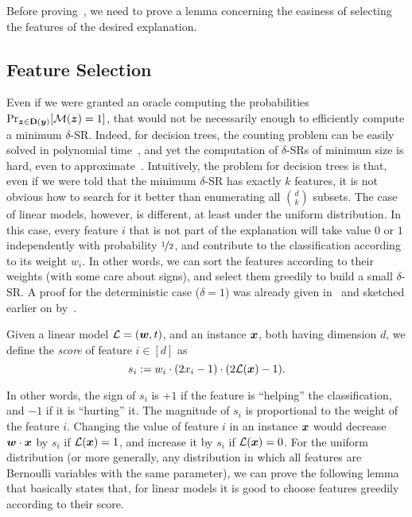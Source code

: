 Before proving~, we need to prove a lemma concerning the easiness of selecting the features of the desired explanation.

\subsection{Feature Selection}\label{subsec:feature_selection}

Even if we were granted an oracle computing the probabilities
\(
    \Pr_{{\bm{z}}  \in \mathbf{D}({\bm{y}})}[\mathcal{M}({\bm{z}}) = 1]
\), that would not be necessarily enough to efficiently compute a minimum $\delta$-SR. Indeed, for decision trees, the counting problem can be easily solved in polynomial time~\cite{NEURIPS2020_b1adda14}, and yet the computation of $\delta$-SRs of minimum size is hard, even to approximate~\cite{NEURIPS2022_b8963f6a, Kozachinskiy_2023}.
Intuitively, the problem for decision trees is that, even if we were told that the minimum $\delta$-SR has exactly $k$ features, it is not obvious how to search for it better than enumerating all $\binom{d}{k}$ subsets. The case of linear models, however, is different, at least under the uniform distribution. In this case, every feature $i$ that is not part of the explanation will take value $0$ or $1$ independently with probability $\nicefrac{1}{2}$, and contribute to the classification according to its weight $w_i$. In other words, we can sort the features according to their weights (with some care about signs), and select them greedily to build a small $\delta$-SR. A proof for the deterministic case ($\delta = 1$) was already given in~\cite{NEURIPS2020_b1adda14} and sketched earlier on by~\cite{ExplainingNaiveBayes}.

\begin{definition}\label{def:scores}
    Given a linear model $\mathcal{L} = ({\bm{w}}, t)$, and an instance ${\bm{x}}$, both having dimension $d$, we define the \emph{score} of feature $i \in [d]$ as 
    \[
        s_i := w_i \cdot (2x_i - 1) \cdot (2\mathcal{L}({\bm{x}}) - 1).    
    \]
\end{definition}

In other words, the sign of $s_i$ is $+1$ if the feature is ``helping'' the classification, and $-1$ if it is ``hurting'' it. The magnitude of $s_i$ is proportional to the weight of the feature $i$. Changing the value of feature $i$ in an instance ${\bm{x}}$ would decrease ${\bm{w}} \cdot {\bm{x}}$ by $s_i$ if $\mathcal{L}({\bm{x}}) = 1$, and increase it by $s_i$ if $\mathcal{L}({\bm{x}}) = 0$.
For the uniform distribution (or more generally, any distribution in which all features are Bernoulli variables with the same parameter), we can prove the following lemma that basically states that, for linear models it is good to choose features greedily according to their score.

